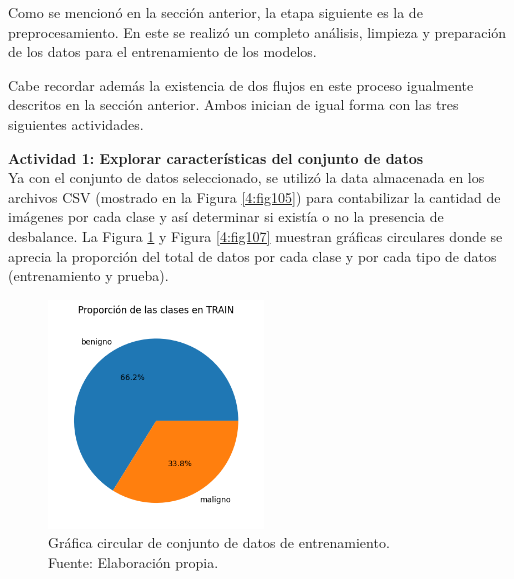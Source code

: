 Como se mencionó en la sección anterior, la etapa siguiente es la de preprocesamiento. En este se realizó un completo análisis, limpieza y preparación de los datos para el entrenamiento de los modelos.

Cabe recordar además la existencia de dos flujos en este proceso igualmente descritos en la sección anterior. Ambos inician de igual forma con las tres siguientes actividades.

\textbf{Actividad 1: Explorar características del conjunto de datos}
\\
Ya con el conjunto de datos seleccionado, se utilizó la data almacenada en los archivos CSV (mostrado en la Figura \ref{4:fig105}) para contabilizar la cantidad de imágenes por cada clase y así determinar si existía o no la presencia de desbalance. La Figura \ref{4:fig106} y Figura \ref{4:fig107} muestran gráficas circulares donde se aprecia la proporción del total de datos por cada clase y por cada tipo de datos (entrenamiento y prueba).

\begin{figure}[H]
	\begin{center}
		\includegraphics[width=0.51\textwidth]{4/figures/train_circular.png}
		\caption[Gráfica circular de conjunto de datos de entrenamiento]{Gráfica circular de conjunto de datos de entrenamiento. \\
		Fuente: Elaboración propia.}
		\label{4:fig106}
	\end{center}
\end{figure}

